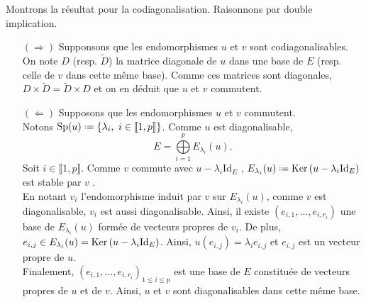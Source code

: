 \begin{preuve} 
    Montrons la résultat pour la codiagonalisation. Raisonnons par double implication.
    \begin{itemize}
        \item[$(\Rightarrow)$] Supponsons que les endomorphismes $u$ et $v$ sont codiagonalisables. On note $D$ (resp. $\widetilde{D}$) la matrice diagonale de $u$ dans une base de $E$ (resp. celle de $v$ dans cette même base). Comme ces matrices sont diagonales, $D \times \widetilde{D} = \widetilde{D} \times D$ \note {} et on en déduit que $u$ et $v$ commutent.
        \item[$(\Leftarrow)$] Supposons que les endomorphismes $u$ et $v$ commutent. \\ 
        Notons $\mathrm{Sp}(u) \defeq \{ \lambda_i,\ i \in \llbracket1, p \rrbracket \}$. Comme $u$ est diagonalisable, 
        $$E = \bigoplus\limits_{i = 1}^{p} E_{\lambda_i}(u).$$
        Soit $i \in \llbracket 1, p \rrbracket$. Comme $v$ commute avec $u - \lambda_i \mathrm{Id}_E$ \note 
        , $E_{\lambda_i}(u) \defeq \Ker(u - \lambda_i \Id_E)$ est stable par $v$ \note. \\
        En notant $v_i$ l'endomorphisme induit par $v$ sur $E_{\lambda_i}(u)$, comme $v$ est diagonalisable, $v_i$ est aussi diagonalisable. Ainsi, il existe $(e_{i, 1}, \dots, e_{i, r_i})$ une base de $E_{\lambda_i}(u)$ formée de vecteurs propres de $v_i$. De plus, $e_{i, j} \in E_{\lambda_i}(u) = \mathrm{Ker}\,(u - \lambda_i \mathrm{Id}_E)$. Ainsi, $u(e_{i,j}) = \lambda_i e_{i,j}$ et $e_{i,j}$ est un vecteur propre de $u$. \\
        Finalement, $(e_{i, 1}, \dots, e_{i, r_i})_{1 \leqslant i \leqslant p}$ est une base de $E$ constituée de vecteurs propres de $u$ et de $v$. Ainsi, $u$ et $v$ sont diagonalisables dans cette même base. 
    \end{itemize}
\end{preuve}

